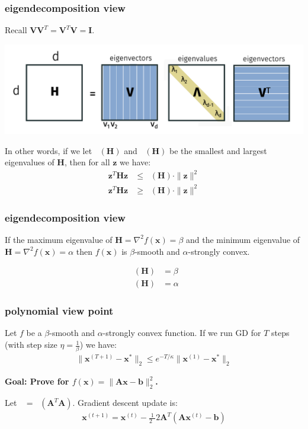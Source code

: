 \documentclass[compress]{beamer}
\newcommand{\bv}[1]{\mathbf{#1}}
\DeclareMathOperator*{\lmin}{\lambda_{min}}
\DeclareMathOperator*{\lmax}{\lambda_{max}}
\begin{document}
\begin{frame}[t]
	\frametitle{eigendecomposition view}
	Recall $\bv{V}\bv{V}^T = \bv{V}^T\bv{V} = \bv{I}$.
	\begin{center}
		\includegraphics[width=.9\textwidth]{eigendecomp.png}
	\end{center}
	In other words, if we let $\lmax(\bv{H})$ and $\lmin(\bv{H})$ be the smallest and largest eigenvalues of $\bv{H}$, then for all $\bv{z}$ we have: 
	\begin{align*}
		\bv{z}^T\bv{H}\bv{z} &\leq \lmax(\bv{H})\cdot \|\bv{z}\|^2 \\
		\bv{z}^T\bv{H}\bv{z} &\geq \lmin(\bv{H})\cdot \|\bv{z}\|^2 
	\end{align*}
	
\end{frame}


\begin{frame}[t]
	\frametitle{eigendecomposition view}
	If the maximum eigenvalue of $\bv{H} = \nabla^2f(\bv{x}) = \beta$ and the minimum eigenvalue of $\bv{H} = \nabla^2f(\bv{x}) = \alpha$ then $f(\bv{x})$ is $\beta$-smooth and $\alpha$-strongly convex.
	
	\begin{align*}
		\lmax(\bv{H}) &= \beta\\
		\lmin(\bv{H}) &= \alpha
	\end{align*}
\end{frame}

\begin{frame}[t]
	\frametitle{polynomial view point}
	\begin{theorem}
		Let $f$ be a $\beta$-smooth and $\alpha$-strongly convex function. If we run GD for $T$ steps (with step size $\eta = \frac{1}{\beta}$) we have:
		\begin{align*}
			\|\bv{x}^{(T+1)} - \bv{x}^*\|_2 \leq e^{-T/\kappa} \|\bv{x}^{(1)} - \bv{x}^*\|_2
		\end{align*} 
	\end{theorem}
	
	\begin{center}
		\alert{\textbf{Goal: Prove for $f(\bv{x}) = \|\bv{A}\bv{x} - \bv{b}\|_2^2$.}}
	\end{center}	
	Let $\lmax = \lmax(\bv{A}^T\bv{A})$. Gradient descent update is:
	\begin{align*}
		\bv{x}^{(t+1)} = \bv{x}^{(t)} - \frac{1}{2\lmax}2\bv{A}^T(\bv{A}\bv{x}^{(t)} - \bv{b})
	\end{align*}
	
\end{frame}
\end{document}
